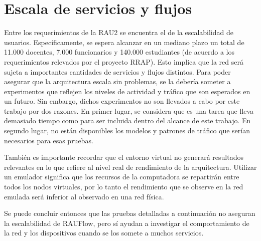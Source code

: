 \section{Escala de servicios y flujos}
Entre los requerimientos de la RAU2 se encuentra el de la escalabilidad de usuarios. Específicamente, se espera alcanzar en un mediano plazo un total de 11.000 docentes, 7.000 funcionarios y 140.000 estudiantes (de acuerdo a los requerimientos relevados por el proyecto RRAP). Esto implica que la red será sujeta a importantes cantidades de servicios y flujos distintos. Para poder asegurar que la arquitectura escala sin problemas, se la debería someter a experimentos que reflejen los niveles de actividad y tráfico que son esperados en un futuro. Sin embargo, dichos experimentos no son llevados a cabo por este trabajo por dos razones. En primer lugar, se considera que es una tarea que lleva demasiado tiempo como para ser incluida dentro del alcance de este trabajo. En segundo lugar, no están disponibles los modelos y patrones de tráfico que serían necesarios para esas pruebas.

También es importante recordar que el entorno virtual no generará resultados relevantes en lo que refiere al nivel real de rendimiento de la arquitectura. Utilizar un emulador significa que los recursos de la computadora se repartirán entre todos los nodos virtuales, por lo tanto el rendimiento que se observe en la red emulada será inferior al observado en una red física.

Se puede concluir entonces que las pruebas detalladas a continuación no aseguran la escalabilidad de RAUFlow, pero sí ayudan a investigar el comportamiento de la red y los dispositivos cuando se los somete a muchos servicios.


